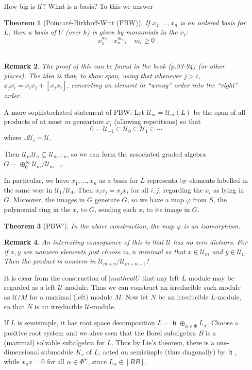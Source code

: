\documentclass[12pt]{article}
\theoremstyle{nonumberbreak}
\theoremstyle{changebreak}
\newtheorem{thm}{Theorem}[subsection]
\newenvironment{thmprime}[1]
  {\renewcommand{\thethm}{\ref{#1}$'$}%
   \addtocounter{thm}{-1}%
   \begin{thm}}
  {\end{thm}}
\theoremstyle{nonumberbreak}
\theoremstyle{change}
\newtheorem{rmk}[thm]{Remark}
\DeclareMathOperator{\h}{\mathfrak{h}}
\begin{document}
How big is $\mathcal U$? What is a basis? To this we answer
\begin{thm}[Poincar\'e-Birkhoff-Witt (PBW)]\label{thm-pbw}
	If $x_1,\dots,x_n$ is an ordered basis for $L$, then a basis of $U$ (over $k$) is given by 
	monomials in the $x_i$: 
	\[x_1^{m_1}\cdots x_n^{m_n},\quad m_i\ge 0\].
\end{thm}
\begin{rmk}
	The proof of this can be found in the book (p.93-94) (or other places). The idea is that, to show span,
	using that whenever $j>i$, $x_jx_i=x_ix_j+[x_jx_i]$, converting an element in ``wrong'' order into the
	``right'' order.
\end{rmk}
A more sophistochated statement of PBW: Let $\mathcal U_m=\mathcal U_m(L)$ be the span of all products of at most $m$ geneartors $x_i$ (allowing
repetitions) so that 
\[0=\mathcal U_{-1}\subseteq\mathcal U_{0}\subseteq\mathcal U_{1}\subseteq\cdots\]
where $\cup \mathcal U_i=\mathcal U$.

Then $\mathcal U_m\mathcal U_n\subseteq \mathcal U_{m+n}$, so we can form the associated graded algebra
$G=\oplus_0^\infty \mathcal U_m/\mathcal U_{m-1}$.

In particular, we have $x_1,\dots,x_n$ as a basis for $L$ representa by elements labelled in the same way in $\mathcal U_1/\mathcal U_0$.
Then $x_ix_j=x_jx_i$ for all $i,j$, regarding the $x_i$ as lying in $G$. Moreover, the images in $G$ generate $G$, so 
we have a map $\varphi$ from $S$, the polynomial ring in the $x_i$ to $G$, sending each $x_i$ to its image in $G$.
\begin{thmprime}{thm-pbw}[PBW']
	In the above construction, the map $\varphi$ is an isomorphism.
\end{thmprime}
\begin{rmk}
	An interesting consequence of this is that $\mathcal U$ has no zero divisors. For if $x,y$ are nonzero elements just choose $m,n$ minimal so that 
	$x\in\mathcal U_m$ and $y\in\mathcal U_n$. Then the product is nonzero in $\mathcal U_{m+n}/\mathcal U_{m+n-1}$!
\end{rmk}

It is clear from the construction of $|mathcal U$ that any left $L$ module may be regarded as a left $\mathcal U$-module. Thus we can construct an irreducible such module
as $\mathcal U/M$ for a maximal (left) module $M$. Now let $N$ be an irreducible $L$-module,
so that $N$ is an irreducible $\mathcal U$-module. 

If $L$ is semisimple, it has root space decomposition $L=\h\oplus_{\alpha\in\Phi}L_\alpha$. Choose a positive root system
and we ahve seen that the Borel subalgebra $B$ is a (maximal) solvable subalgebra for $L$. Thus by Lie's theorem, there is a 
one-dimensional submodule $K_v$ of $L$, acted on semisimple (thus diagonally) by $\h$,
while $x_\alpha v=0$ for all $\alpha\in\Phi^+$, since $L_\alpha\in [BB]$.
\end{document}
